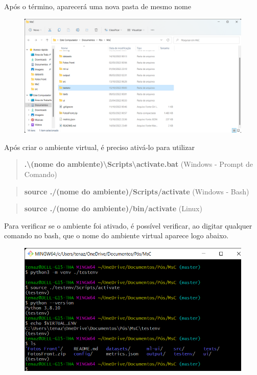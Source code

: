 \documentclass[portugues]{ic-tese}
\begin{document}
Após o término, aparecerá uma nova pasta de mesmo nome

\begin{figure}[H]
\centering
\includegraphics[scale=0.25]{images/doc-install/virtualenv.png}
\label{fig:DocInstallVirtualEnvFolder}
\end{figure}

Após criar o ambiente virtual, é preciso ativá-lo para utilizar

\begin{quote}
\textbf{.\textbackslash (nome do ambiente)\textbackslash Scripts\textbackslash activate.bat} (Windows - Prompt de Comando)
\end{quote}
\begin{quote}
\textbf{source ./(nome do ambiente)/Scripts/activate} (Windows - Bash)
\end{quote}
\begin{quote}
\textbf{source ./(nome do ambiente)/bin/activate} (Linux)
\end{quote}

Para verificar se o ambiente foi ativado, é possível verificar, ao digitar qualquer comando no bash, que o nome do ambiente virtual aparece logo abaixo.

\begin{figure}[h!]
\centering
\includegraphics[scale=0.4]{images/doc-install/virtualenv-check.png}
\label{fig:DocInstallVirtualEnvCheck}
\end{figure}
\end{document}
